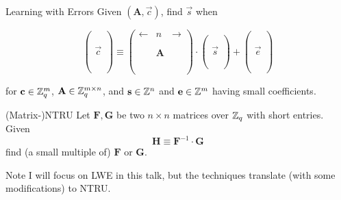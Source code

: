 \documentclass[xcolor=table,10pt,aspectratio=169]{beamer}
\begin{document}
\begin{frame}[label={sec:org0bae23b}]{Learning with Errors}
Given \((\mathbf{A},\vec{c})\), find \(\vec{s}\) when

\[
\left(\begin{array}{c}
\\
\\
\\ 
\vec{c} \\
\\
\\
\\
\end{array} \right) \equiv \left(
\begin{array}{ccc}
\leftarrow & n & \rightarrow \\
\\
\\ 
& \mathbf{A} & \\
\\
\\
\\
\end{array} \right) \cdot \left( \begin{array}{c}
\\\
\\
\vec{s} \\
\\
\\
\end{array} \right) + \left(
\begin{array}{c}
\\
\\
\\ 
\vec{e} \\
\\
\\
\\
\end{array} 
\right)
\]

for \(\mathbf{c} \in \mathbb{Z}_q^{m}\), \(\mathbf{A} \in \mathbb{Z}_q^{m \times n}\), and \(\mathbf{s} \in \mathbb{Z}^{n}\) and \(\mathbf{e} \in \mathbb{Z}^{m}\) having small coefficients.
\end{frame}

\begin{frame}[label={sec:org3197975}]{(Matrix-)NTRU}
Let \(\mathbf{F}, \mathbf{G}\) be two \(n \times n\) matrices over \(\mathbb{Z}_q\) with short entries. Given
\[\mathbf{H} \equiv \mathbf{F}^{-1} \cdot \mathbf{G}\]
find (a small multiple of) \(\mathbf{F}\) or \(\mathbf{G}\).

\pause

\begin{block}{Note}
I will focus on LWE in this talk, but the techniques translate (with some modifications) to NTRU.
\end{block}
\end{frame}
\end{document}
